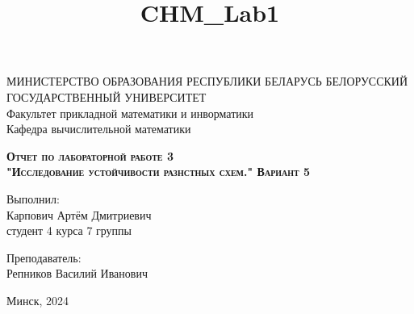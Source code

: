 \documentclass[11pt]{article}
\title{CHM\_Lab1}
\begin{document}
    
    \begin{titlepage}
    \newpage
    
    \begin{center}
    МИНИСТЕРСТВО ОБРАЗОВАНИЯ РЕСПУБЛИКИ БЕЛАРУСЬ БЕЛОРУССКИЙ ГОСУДАРСТВЕННЫЙ УНИВЕРСИТЕТ \\
    Факультет прикладной математики и инворматики \\ Кафедра вычислительной математики
 
    \end{center}
    
    \vspace{8em}
    
    \vspace{2em}
    
    \begin{center}
    \textsc{\textbf{Отчет по лабораторной работе 3 \\ "Исследование устойчивости разнстных схем." \linebreak Вариант 5}}
    \end{center}
    
    \vspace{6em}
    
    \begin{flushright}
        Выполнил:\\
        Карпович Артём Дмитриевич\\
        студент 4 курса 7 группы
    \end{flushright}
    
    \begin{flushright}
        Преподаватель:\\
        Репников Василий Иванович
    \end{flushright}
    
    \vspace{\fill}
    
    \vspace{\fill}
    
    \begin{center}
    Минск, 2024
    \end{center}
    
    \end{titlepage}
    
\end{document}
